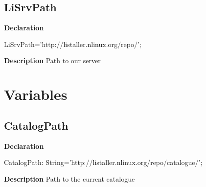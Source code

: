 \documentclass{report}
\newif\ifpdf
\begin{document}
\subsection*{LiSrvPath}
\fi
\label{swcatalog-LiSrvPath}
\begin{list}{}{
\setlength{\itemindent}{0cm}
\setlength{\listparindent}{0cm}
\setlength{\leftmargin}{\evensidemargin}
\addtolength{\leftmargin}{\tmplength}
\settowidth{\labelsep}{X}
\addtolength{\leftmargin}{\labelsep}
\setlength{\labelwidth}{\tmplength}
}
\item[\textbf{Declaration}\hfill]
\ifpdf
\begin{flushleft}
\fi
\begin{ttfamily}
LiSrvPath='http://listaller.nlinux.org/repo/';\end{ttfamily}

\ifpdf
\end{flushleft}
\fi

\par
\item[\textbf{Description}]
Path to our server

\end{list}
\section{Variables}
\ifpdf
\subsection*{\large{\textbf{CatalogPath}}\normalsize\hspace{1ex}\hrulefill}
\else
\subsection*{CatalogPath}
\fi
\label{swcatalog-CatalogPath}
\begin{list}{}{
\setlength{\itemindent}{0cm}
\setlength{\listparindent}{0cm}
\setlength{\leftmargin}{\evensidemargin}
\addtolength{\leftmargin}{\tmplength}
\settowidth{\labelsep}{X}
\addtolength{\leftmargin}{\labelsep}
\setlength{\labelwidth}{\tmplength}
}
\item[\textbf{Declaration}\hfill]
\ifpdf
\begin{flushleft}
\fi
\begin{ttfamily}
CatalogPath: String='http://listaller.nlinux.org/repo/catalogue/';\end{ttfamily}

\ifpdf
\end{flushleft}
\fi

\par
\item[\textbf{Description}]
Path to the current catalogue

\end{list}
\ifpdf
\end{document}
